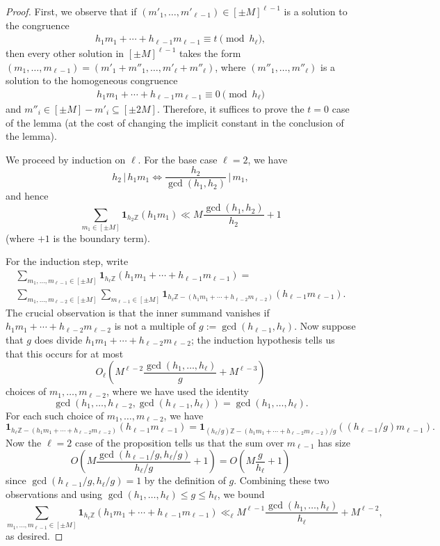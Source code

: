 \documentclass[11pt]{amsart}
\theoremstyle{definition}
\newcommand{\brac}[1]{\mathopen{}\left( #1 \mathclose{}\right)}
\begin{document}
\begin{proof}
First, we observe that if $(m'_1, \ldots, m'_{\ell-1}) \in [\pm M]^{\ell-1}$ is a solution to the congruence
\begin{align*}
    h_1 m_1 + \cdots + h_{\ell-1} m_{\ell-1} \equiv t \pmod {h_\ell},
\end{align*}
then every other solution in $[\pm M]^{\ell-1}$ takes the form $(m_1,\ldots, m_{\ell-1}) = (m'_1 + m''_1, \ldots, m'_\ell + m''_\ell)$, where $(m''_1, \ldots, m''_\ell)$ is a solution to the homogeneous congruence
\begin{align*}
    h_1 m_1 + \cdots + h_{\ell-1} m_{\ell-1} \equiv 0 \pmod {h_\ell}
\end{align*}
and $m''_i \in [\pm M]-m'_i\subseteq [\pm 2M]$.
Therefore, it suffices to prove the $t=0$ case of the lemma (at the cost of changing the implicit constant in the conclusion of the lemma).

We proceed by induction on $\ell$.  For the base case $\ell=2$, we have
$$h_2\, | \, h_1 m_1 \iff \frac{h_2}{\gcd(h_1, h_2)}\,\Big| \, m_1,$$
and hence
$$\sum_{m_1 \in [\pm M]} \mathbf{1}_{h_2\mathbb{Z}} (h_1m_1)\ll M \frac{\gcd(h_1, h_2)}{h_2} + 1$$
(where $+1$ is the boundary term).

For the induction step, write
\begin{multline*}
\sum_{m_1, \ldots, m_{\ell-1}\in[\pm M]}\mathbf{1}_{h_\ell\mathbb{Z} }(h_1 m_1 + \cdots + h_{\ell-1} m_{\ell-1})=\\
\sum_{m_1, \ldots, m_{\ell-2}\in[\pm M]} \sum_{m_{\ell-1} \in [\pm M]}\mathbf{1}_{h_\ell\mathbb{Z}-(h_1 m_1 + \cdots + h_{\ell-2} m_{\ell-2})}(h_{\ell-1} m_{\ell-1}).
\end{multline*}
The crucial observation is that the inner summand vanishes if $h_1m_1+\cdots+h_{\ell-2}m_{\ell-2}$ is not a multiple of $g:=\gcd(h_{\ell-1},h_\ell)$.  Now suppose that $g$ does divide $h_1m_1+\cdots+h_{\ell-2}m_{\ell-2}$; the induction hypothesis tells us that this occurs for at most $$O_\ell\brac{M^{\ell-2} \frac{\gcd(h_1, \ldots, h_\ell)}{g}+M^{\ell-3}}$$ choices of $m_1, \ldots, m_{\ell-2}$, where we have used the identity 
$$\gcd(h_1, \ldots, h_{\ell-2},\gcd(h_{\ell-1},h_\ell))=\gcd(h_{1},\ldots,h_\ell).$$  
For each such choice of $m_1, \ldots, m_{\ell-2}$, we have
$$\mathbf{1}_{h_\ell\mathbb{Z}-(h_1 m_1 + \cdots + h_{\ell-2} m_{\ell-2})}(h_{\ell-1} m_{\ell-1})=\mathbf{1}_{(h_\ell/g)\mathbb{Z}-(h_1 m_1 + \cdots + h_{\ell-2} m_{\ell-2})/g}((h_{\ell-1}/g)m_{\ell-1}).$$
Now the $\ell=2$ case of the proposition tells us that the sum over $m_{\ell-1}$ has size
$$O\brac{M\frac{\gcd(h_{\ell-1}/g,h_\ell/g)}{h_{\ell}/g}+1}=O\brac{M\frac{g}{h_{\ell}}+1}$$
since $\gcd(h_{\ell-1}/g,h_\ell/g)=1$ by the definition of $g$.  Combining these two observations and using $\gcd(h_1, \ldots, h_\ell) \leq g \leq h_\ell$, we bound
$$\sum_{m_1, \ldots, m_{\ell-1}\in[\pm M]}\mathbf{1}_{h_\ell\mathbb{Z} }(h_1 m_1 + \cdots + h_{\ell-1} m_{\ell-1})\ll_\ell M^{\ell-1}\frac{\gcd(h_1, \ldots, h_\ell)}{h_\ell}+M^{\ell-2},$$
as desired.
\end{proof}
\end{document}
